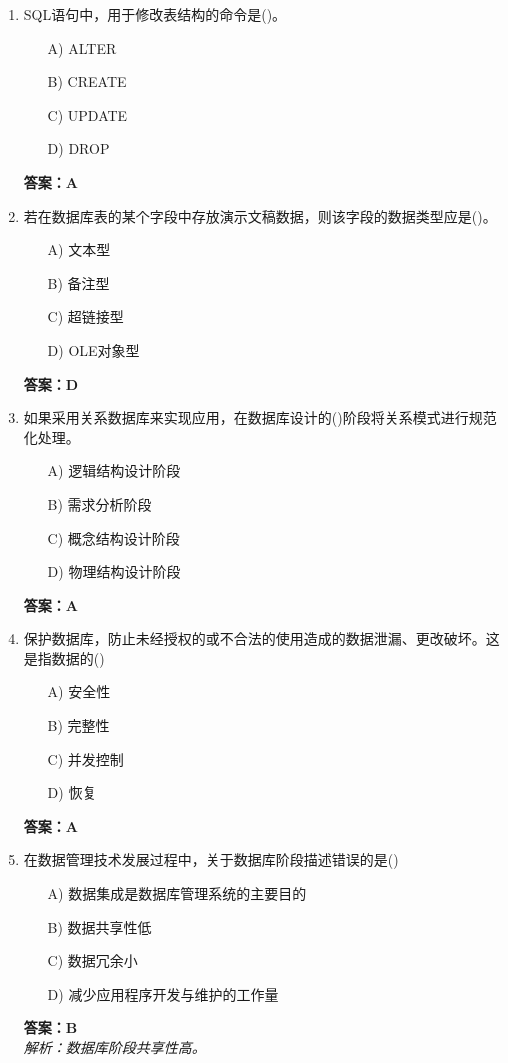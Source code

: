 \documentclass[a4paper,12pt]{article}
\begin{document}
\begin{enumerate}[label=\arabic*.]
\item SQL语句中，用于修改表结构的命令是()。
\begin{itemize}
    \item[A)] ALTER
    \item[B)] CREATE
    \item[C)] UPDATE
    \item[D)] DROP
\end{itemize}
\textbf{答案：A}

\item 若在数据库表的某个字段中存放演示文稿数据，则该字段的数据类型应是()。
\begin{itemize}
    \item[A)] 文本型
    \item[B)] 备注型
    \item[C)] 超链接型
    \item[D)] OLE对象型
\end{itemize}
\textbf{答案：D}

\item 如果采用关系数据库来实现应用，在数据库设计的()阶段将关系模式进行规范化处理。
\begin{itemize}
    \item[A)] 逻辑结构设计阶段
    \item[B)] 需求分析阶段
    \item[C)] 概念结构设计阶段
    \item[D)] 物理结构设计阶段
\end{itemize}
\textbf{答案：A}

\item 保护数据库，防止未经授权的或不合法的使用造成的数据泄漏、更改破坏。这是指数据的()
\begin{itemize}
    \item[A)] 安全性
    \item[B)] 完整性
    \item[C)] 并发控制
    \item[D)] 恢复
\end{itemize}
\textbf{答案：A}

\item 在数据管理技术发展过程中，关于数据库阶段描述错误的是()
\begin{itemize}
    \item[A)] 数据集成是数据库管理系统的主要目的
    \item[B)] 数据共享性低
    \item[C)] 数据冗余小
    \item[D)] 减少应用程序开发与维护的工作量
\end{itemize}
\textbf{答案：B} \\
\textit{解析：数据库阶段共享性高。}


\end{enumerate}
\end{document}
